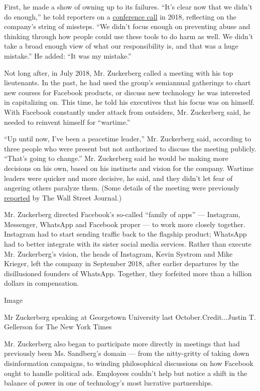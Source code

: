 First, he made a show of owning up to its failures. ``It's clear now
that we didn't do enough,'' he told reporters on a
\href{https://about.fb.com/news/2018/04/hard-questions-protecting-peoples-information/}{conference
call} in 2018, reflecting on the company's string of missteps. ``We
didn't focus enough on preventing abuse and thinking through how people
could use these tools to do harm as well. We didn't take a broad enough
view of what our responsibility is, and that was a huge mistake.'' He
added: ``It was my mistake.''

Not long after, in July 2018, Mr. Zuckerberg called a meeting with his
top lieutenants. In the past, he had used the group's semiannual
gatherings to chart new courses for Facebook products, or discuss new
technology he was interested in capitalizing on. This time, he told his
executives that his focus was on himself. With Facebook constantly under
attack from outsiders, Mr. Zuckerberg said, he needed to reinvent
himself for ``wartime.''

``Up until now, I've been a peacetime leader,'' Mr. Zuckerberg said,
according to three people who were present but not authorized to discuss
the meeting publicly. ``That's going to change.'' Mr. Zuckerberg said he
would be making more decisions on his own, based on his instincts and
vision for the company. Wartime leaders were quicker and more decisive,
he said, and they didn't let fear of angering others paralyze them.
(Some details of the meeting were previously
\href{https://www.wsj.com/articles/with-facebook-at-war-zuckerberg-adopts-more-aggressive-style-1542577980}{reported}
by The Wall Street Journal.)

Mr. Zuckerberg directed Facebook's so-called ``family of apps'' ---
Instagram, Messenger, WhatsApp and Facebook proper --- to work more
closely together. Instagram had to start sending traffic back to the
flagship product; WhatsApp had to better integrate with its sister
social media services. Rather than execute Mr. Zuckerberg's vision, the
heads of Instagram, Kevin Systrom and Mike Krieger, left the company in
September 2018, after earlier departures by the disillusioned founders
of WhatsApp. Together, they forfeited more than a billion dollars in
compensation.

Image

Mr Zuckerberg speaking at Georgetown University last
October.Credit...Justin T. Gellerson for The New York Times

Mr. Zuckerberg also began to participate more directly in meetings that
had previously been Ms. Sandberg's domain --- from the nitty-gritty of
taking down disinformation campaigns, to winding philosophical
discussions on how Facebook ought to handle political ads. Employees
couldn't help but notice a shift in the balance of power in one of
technology's most lucrative partnerships.

